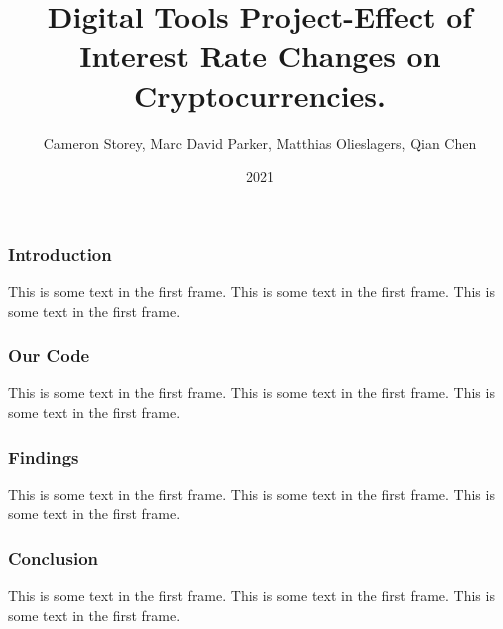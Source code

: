 \documentclass{beamer}
\title{Digital Tools Project-Effect of Interest Rate Changes on Cryptocurrencies.}
\author{Cameron Storey, Marc David Parker, Matthias Olieslagers, Qian Chen}
\institute{UZH Digital Tools for Finance}
\date{2021}
\begin{document}
\frame{\titlepage}

\begin{frame}
\frametitle{Introduction}
This is some text in the first frame. This is some text in the first frame. This is some text in the first frame.
\end{frame}

\begin{frame}
    \frametitle{Our Code}
    This is some text in the first frame. This is some text in the first frame. This is some text in the first frame.
\end{frame}

\begin{frame}
    \frametitle{Findings}
    This is some text in the first frame. This is some text in the first frame. This is some text in the first frame.
\end{frame}

\begin{frame}
    \frametitle{Conclusion}
    This is some text in the first frame. This is some text in the first frame. This is some text in the first frame.
\end{frame}
\end{document}
